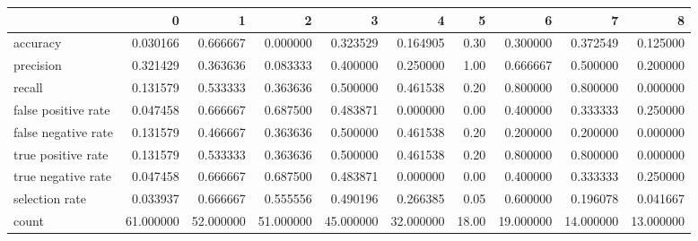 \begin{tabular}{lrrrrrrrrr}
\toprule
{} &          0 &          1 &          2 &          3 &          4 &      5 &          6 &          7 &          8 \\
\midrule
accuracy            &   0.030166 &   0.666667 &   0.000000 &   0.323529 &   0.164905 &   0.30 &   0.300000 &   0.372549 &   0.125000 \\
precision           &   0.321429 &   0.363636 &   0.083333 &   0.400000 &   0.250000 &   1.00 &   0.666667 &   0.500000 &   0.200000 \\
recall              &   0.131579 &   0.533333 &   0.363636 &   0.500000 &   0.461538 &   0.20 &   0.800000 &   0.800000 &   0.000000 \\
false positive rate &   0.047458 &   0.666667 &   0.687500 &   0.483871 &   0.000000 &   0.00 &   0.400000 &   0.333333 &   0.250000 \\
false negative rate &   0.131579 &   0.466667 &   0.363636 &   0.500000 &   0.461538 &   0.20 &   0.200000 &   0.200000 &   0.000000 \\
true positive rate  &   0.131579 &   0.533333 &   0.363636 &   0.500000 &   0.461538 &   0.20 &   0.800000 &   0.800000 &   0.000000 \\
true negative rate  &   0.047458 &   0.666667 &   0.687500 &   0.483871 &   0.000000 &   0.00 &   0.400000 &   0.333333 &   0.250000 \\
selection rate      &   0.033937 &   0.666667 &   0.555556 &   0.490196 &   0.266385 &   0.05 &   0.600000 &   0.196078 &   0.041667 \\
count               &  61.000000 &  52.000000 &  51.000000 &  45.000000 &  32.000000 &  18.00 &  19.000000 &  14.000000 &  13.000000 \\
\bottomrule
\end{tabular}
